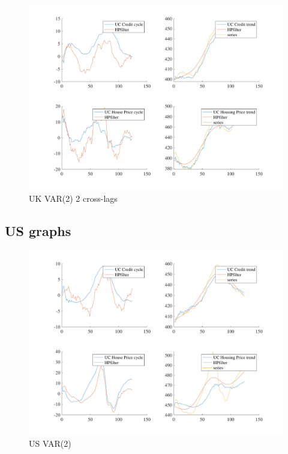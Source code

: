 \documentclass[
  12pt,
]{article}
\begin{document}
\begin{figure}

{\centering \includegraphics[width=0.85\linewidth]{../../Regression/Bayesian_UC_VAR2_nodrift_Crosscycle2lags/OutputData/cycles_GB} 

}

\caption{UK VAR(2) 2 cross-lags}\label{fig:unnamed-chunk-5}
\end{figure}

\clearpage

\hypertarget{us-graphs}{%
\subsection{US graphs}\label{us-graphs}}

\begin{figure}

{\centering \includegraphics[width=0.85\linewidth]{../../Regression/Bayesian_UC_VAR2_nodrift/OutputData/cycles_US} 

}

\caption{US VAR(2)}\label{fig:unnamed-chunk-6}
\end{figure}
\end{document}
